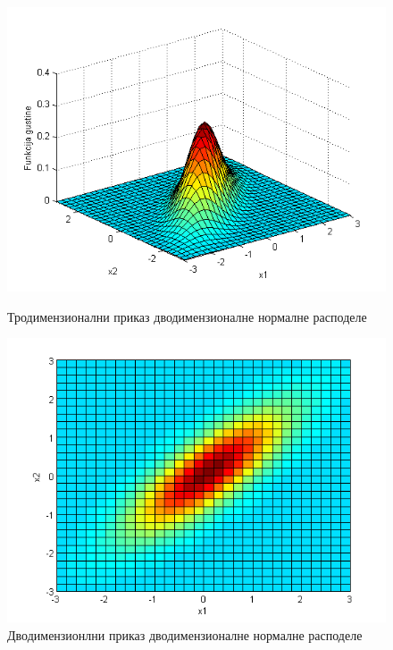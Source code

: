 \begin{figure}[H]
  \includegraphics[scale=0.5]{./Slike/slika25.png} 
  \caption{Тродимензионални приказ дводимензионалне нормалне расподеле}\label{fig:slika25}
\endminipage\hfill
{}
  \includegraphics[scale=0.5]{./Slike/slika26.png} 
  \caption{Дводимензионлни приказ дводимензионалне нормалне расподеле}\label{fig:slika26}
\endminipage\hfill

\end{figure}


